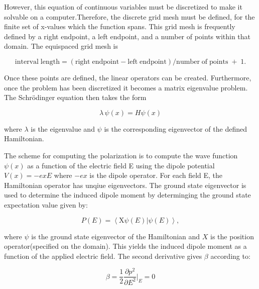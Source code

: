 \documentclass{report}
\theoremstyle{definition}
\begin{document}
However, this equation of continuous variables must be discretized to make it solvable on a computer.Therefore, the discrete grid mesh must be defined, for the finite set of x-values which the function spans. This grid mesh is frequently defined by a right endpoint, a left endpoint, and a number of points within that domain. The equispaced grid mesh is 

\begin{equation}
\mathrm{interval \; length = (right \; endpoint - left \; endpoint) / number \; of \;  points \; + \; 1}.
\end{equation}

 \noindent Once these points are defined, the linear operators can be created. Furthermore, once the problem has been discretized it becomes a matrix eigenvalue problem.\cite{watkins2004fundamentals} The Schr\"odinger equation then takes the form  %

\begin{equation}
\lambda \, \psi(x) = H \psi(x) 
\end{equation}  

\noindent where $\lambda$ is the eigenvalue and $\psi$ is the corresponding eigenvector of the defined Hamiltonian. 

\noindent The scheme for computing the polarization is to compute the wave function $\psi(x)$ as a function of the electric field E using the dipole potential $V(x) = -exE $ where $-ex$ is the dipole operator. For each field E, the Hamiltonian operator has unqiue eigenvectors. The ground state eigenvector is used to determine the induced dipole moment by determinging the ground state expectation value given by:

\begin{equation}
P(E) = \left\langle\mathrm{X} \psi(E) | \psi(E) \right\rangle ,
\end{equation}

where $\psi$ is the ground state eigenvector of the Hamiltonian and $X$ is the position operator(specified on the domain). This yields the induced dipole moment as a function of the applied electric field. The second derivative gives $\beta$ according to:

\begin{equation}
\beta = \frac{1}{2}\frac{\partial p^2}{\partial E^2}\bigr|_E=0
\end{equation}
\end{document}
